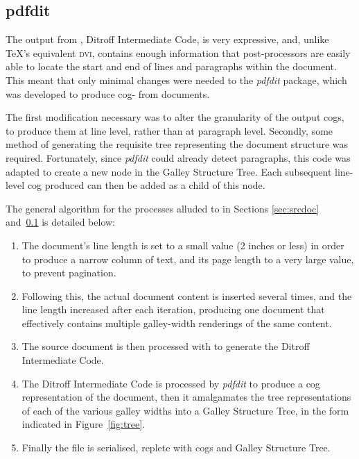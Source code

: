 \subsection{pdfdit}
\label{sec:pdfdit}

The output from \ditroff{}, Ditroff Intermediate Code, is very expressive, and, unlike \TeX's equivalent \textsc{dvi}, contains enough information that post-processors are easily able to locate the start and end of lines and paragraphs within the document. This meant that only minimal changes were needed to the \emph{pdfdit} package,\hspace{0pt}\cite{Bagley2003} which was developed to produce \gls{cog}-\pdf{} from \troff{} documents.

The first modification necessary was to alter the granularity of the output \gls{cog}s, to produce them at line level, rather than at paragraph level. Secondly, some method of generating the requisite tree representing the document structure was required. Fortunately, since \emph{pdfdit} could already detect paragraphs, this code was adapted to create a new node in the Galley Structure Tree. Each subsequent line-level \gls{cog} produced can then be added as a child of this node.

The general algorithm for the processes alluded to in Sections \ref{sec:srcdoc} and~\ref{sec:pdfdit} is detailed below:
\begin{enumerate}
\item The \troff{} document's line length is set to a small value (2 inches or less) in order to produce a narrow column of text, and its page length to a very large value, to prevent pagination.
\item Following this, the actual document content is inserted several times, and the line length increased after each iteration, producing one document that effectively contains multiple galley-width renderings of the same content.
\item The source document is then processed with \ditroff{} to generate the Ditroff Intermediate Code.
\item The Ditroff Intermediate Code is processed by \emph{pdfdit} to produce a \gls{cog} representation of the document, then it amalgamates the tree representations of each of the various galley widths into a Galley Structure Tree, in the form indicated in Figure~\ref{fig:tree}.
\item Finally the \pdf{} file is serialised, replete with \gls{cog}s and Galley Structure Tree.
\end{enumerate}


